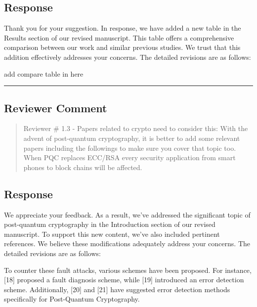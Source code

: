 \subsection{Response}
Thank you for your suggestion. In response, we have added a new table in the Results section of our revised manuscript. This table offers a comprehensive comparison between our work and similar previous studies. We trust that this addition effectively addresses your concerns. The detailed revisions are as follows:

\color{blue}

add compare table in here

\color{black}

\noindent\rule{\linewidth}{2.0pt}

\subsection{Reviewer Comment}
\begin{mdframed}
	\begin{quote}
		Reviewer \# 1.3 - Papers related to crypto need to consider this: With the advent of post-quantum cryptography, it is better to add some relevant papers including the followings to make sure you cover that topic too. When PQC replaces ECC/RSA every security application from smart phones to block chains will be affected.
	\end{quote}
\end{mdframed}

\subsection{Response}

We appreciate your feedback. As a result, we've addressed the significant topic of post-quantum cryptography in the Introduction section of our revised manuscript. To support this new content, we've also included pertinent references. We believe these modifications adequately address your concerns. The detailed revisions are as follows:


\color{blue}

To counter these fault attacks, various schemes have been proposed. For instance, [18] proposed a fault diagnosis scheme, while [19] introduced an error detection scheme. Additionally, [20] and [21] have suggested error detection methods specifically for Post-Quantum Cryptography.

